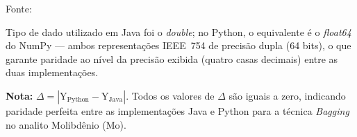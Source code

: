 \begin{table}[H]
\begin{threeparttable}
\begin{center}
\begin{minipage}{0.85\linewidth}
\begin{tablenotes}
\footnotesize
\item Fonte:~\oautor
\item[a] Tipo de dado utilizado em Java foi o \textit{double}; no Python,
o equivalente é o \textit{float64} do NumPy — ambos representações IEEE~754
de precisão dupla (64 bits), o que garante paridade ao nível da precisão exibida (quatro casas decimais) entre as
duas implementações.
\item \textbf{Nota:} $\Delta = |\text{Y}_{\text{Python}} - \text{Y}_{\text{Java}}|$.
Todos os valores de $\Delta$ são iguais a zero, indicando paridade
perfeita entre as implementações Java e Python para a técnica \textit{Bagging}
no analito Molibdênio (Mo).
\end{tablenotes}
\end{minipage}
\end{center}
\end{threeparttable}
\end{table}


